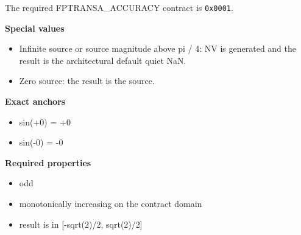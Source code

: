 The required FPTRANSA\_ACCURACY contract is \texttt{0x0001}.

\textbf{Special values}\par
\begin{itemize}
\item Infinite source or source magnitude above pi / 4: NV is generated and the result is the architectural default quiet NaN.
\item Zero source: the result is the source.
\end{itemize}

\textbf{Exact anchors}\par
\begin{itemize}
\item sin(+0) = +0
\item sin(-0) = -0
\end{itemize}

\textbf{Required properties}\par
\begin{itemize}
\item odd
\item monotonically increasing on the contract domain
\item result is in [-sqrt(2)/2, sqrt(2)/2]
\end{itemize}
